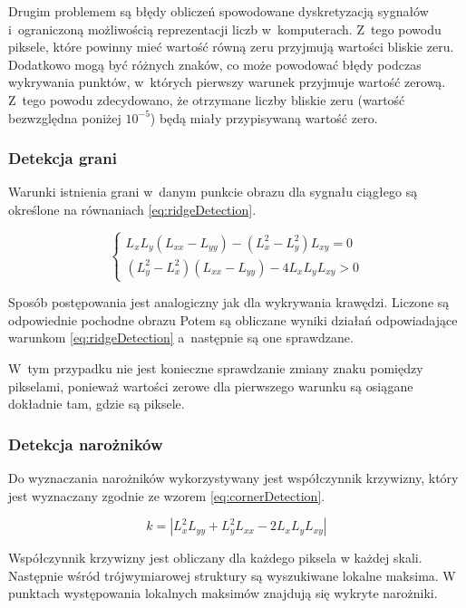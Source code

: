 Drugim problemem są błędy obliczeń spowodowane dyskretyzacją sygnałów i~ograniczoną możliwością reprezentacji liczb w~komputerach. Z~tego powodu piksele, które powinny mieć wartość równą zeru przyjmują wartości bliskie zeru. Dodatkowo mogą być różnych znaków, co może powodować błędy podczas wykrywania punktów, w~których pierwszy warunek przyjmuje wartość zerową. Z~tego powodu zdecydowano, że otrzymane liczby bliskie zeru (wartość bezwzględna poniżej $ 10^{-5} $) będą miały przypisywaną wartość zero.


\subsubsection{Detekcja grani}
\label{subsubsec:detekcjaGrani}

Warunki istnienia grani w~danym punkcie obrazu dla sygnału ciągłego są określone na równaniach \eqref{eq:ridgeDetection}.

\begin{equation}
\label{eq:ridgeDetection}
\left\{ \begin{array}{rl}
L_xL_y(L_{xx}-L_{yy}) - (L_x^2 - L_y^2)L_{xy} = 0 \\
(L_y^2 - L_x^2)(L_{xx} - L_{yy}) - 4 L_xL_yL_{xy} > 0
\end{array} \right.
\end{equation}

Sposób postępowania jest analogiczny jak dla wykrywania krawędzi. Liczone są odpowiednie pochodne obrazu
Potem są obliczane wyniki działań odpowiadające warunkom \eqref{eq:ridgeDetection} a~następnie są one sprawdzane.

W~tym przypadku nie jest konieczne sprawdzanie zmiany znaku pomiędzy pikselami, ponieważ wartości zerowe dla pierwszego warunku są osiągane dokładnie tam, gdzie są piksele. 

\subsubsection{Detekcja narożników}
\label{subsubsec:detekcjaNaroznikow}

Do wyznaczania narożników wykorzystywany jest współczynnik krzywizny, który jest wyznaczany zgodnie ze wzorem \eqref{eq:cornerDetection}.

\begin{equation}
\label{eq:cornerDetection}
k = |L_x^2L_{yy}  + L_y^2L_{xx} - 2L_xL_yL_{xy}|
\end{equation}

Współczynnik krzywizny jest obliczany dla każdego piksela w każdej skali. Następnie wśród trójwymiarowej struktury są wyszukiwane lokalne maksima. W punktach występowania lokalnych maksimów znajdują się wykryte narożniki.


